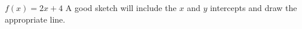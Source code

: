 {$f(x) = 2x+4$
}
{A good sketch will include the $x$ and $y$ intercepts and draw the appropriate line.
}
